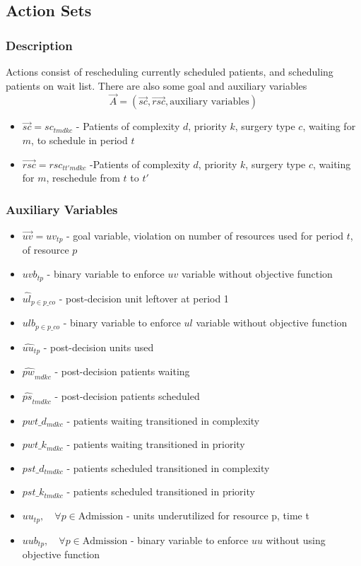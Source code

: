 \subsection{Action Sets}
\subsubsection{Description}
Actions consist of rescheduling currently scheduled patients, and scheduling patients on wait list. There are also some goal and auxiliary variables
\[  \vec{A} = (\vec{sc}, \vec{rsc}, \text{auxiliary variables}) \] 
\begin{itemize}
	\item $\vec{sc} = sc_{tmdkc}$ - Patients of complexity $d$, priority $k$,  surgery type $c$, waiting for $m$, to schedule in period $t$
	\item $\vec{rsc} = rsc_{tt'mdkc}$ -Patients of complexity $d$, priority $k$, surgery type $c$, waiting for $m$, reschedule from $t$ to $t'$
\end{itemize}

\subsubsection{Auxiliary Variables}
\begin{itemize}
	\item $\vec{uv} = uv_{tp}$ - goal variable, violation on number of resources used for period $t$, of resource $p$
	\item $uvb_{tp}$ - binary variable to enforce $uv$ variable without objective function
	\item $\hat{ul}_{p \in p\_co}$ - post-decision unit leftover at period 1
	\item $ulb_{p \in p\_co}$ - binary variable to enforce $ul$ variable without objective function
	\item $\hat{uu}_{tp}$ - post-decision units used
	\item $\hat{pw}_{mdkc}$ - post-decision patients waiting
	\item $\hat{ps}_{tmdkc}$ - post-decision patients scheduled
	\item $pwt\_d_{mdkc}$ - patients waiting transitioned in complexity
	\item $pwt\_k_{mdkc}$ - patients waiting transitioned in priority
	\item $pst\_d_{tmdkc}$ - patients scheduled transitioned in complexity
	\item $pst\_k_{tmdkc}$ - patients scheduled transitioned in priority
	\item $uu_{tp}, \quad \forall p \in {\text{Admission}}$ - units underutilized for resource p, time t
	\item $uub_{tp}, \quad \forall p \in {\text{Admission}}$ - binary variable to enforce $uu$ without using objective function
\end{itemize}
